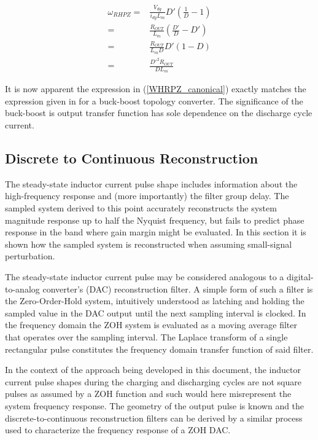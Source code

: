 \documentclass[conference]{IEEEtran}
\begin{document}
\begin{align}
	\omega_{RHPZ} =& \frac{V_{dg}}{ i_{dg} L_m } D' (\frac{1}{D} - 1) \nonumber \\
	=& \frac{R_{OUT}}{L_m} (\frac{D'}{D} - D') \nonumber \\
	=&  \frac{R_{OUT}}{L_m D} D'(1-D) \nonumber \\
	=& \frac{D'^2 R_{OUT}}{D L_m}
	\label{WHRPZ_canonical}
\end{align}

It is now apparent the expression in (\ref{WHRPZ_canonical}) exactly matches the expression given in \cite{b2} for a buck-boost topology converter.  The significance of the buck-boost is output transfer function has sole dependence on the discharge cycle current.


\subsection{Discrete to Continuous Reconstruction}
The steady-state inductor current pulse shape includes information about the high-frequency response and (more importantly) the filter group delay. The sampled system derived to this point accurately reconstructs the system magnitude response up to half the Nyquist frequency, but fails to predict phase response in the band where gain margin might be evaluated.  In this section it is shown how the sampled system is reconstructed when assuming small-signal perturbation.

The steady-state inductor current pulse may be considered analogous to a digital-to-analog converter's (DAC) reconstruction filter. A simple form of such a filter is the Zero-Order-Hold system, intuitively understood as latching and holding the sampled value in the DAC output until the next sampling interval is clocked.  In the frequency domain the ZOH system is evaluated as a moving average filter that operates over the sampling interval.  The Laplace transform of a single rectangular pulse constitutes the frequency domain transfer function of said filter.  

In the context of the approach being developed in this document, the inductor current pulse shapes during the charging and discharging cycles are not square pulses as assumed by a ZOH function and such would here misrepresent the system frequency response.  The geometry of the output pulse is known and the discrete-to-continuous reconstruction filters can be derived by a similar process used to characterize the frequency response of a ZOH DAC. 
\end{document}
